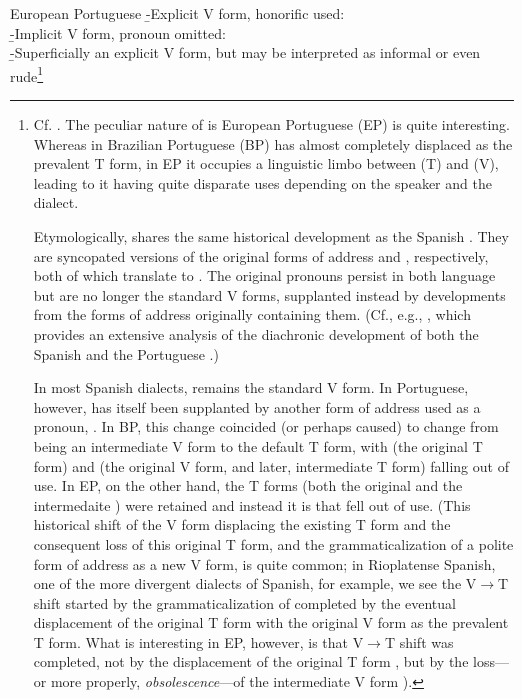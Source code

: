 \pex
	\a European Portuguese
		\beginsubsub
			\b{-}{Explicit V form, honorific used:\\
				 }
			\b{-}{Implicit V form, pronoun omitted:\\
				 }
			\b{-}{Superficially an explicit V form, but may be interpreted as informal or even rude\footnote{
				Cf. \textcite{laraport}. The peculiar nature of  is European Portuguese (EP) is quite interesting. Whereas in Brazilian Portuguese (BP)  has almost completely displaced  as the prevalent T form, in EP it occupies a linguistic limbo between  (T) and  (V), leading to it having quite disparate uses depending on the speaker and the dialect.

				Etymologically,  shares the same historical development as the Spanish . They are syncopated versions of the original forms of address  and , respectively, both of which translate to . The original pronouns  persist in both language but are no longer the standard V forms, supplanted instead by developments from the forms of address originally containing them. (Cf., e.g., \cite{hummelport}, which provides an extensive analysis of the diachronic development of both the Spanish  and the Portuguese .)
	
				In most Spanish dialects,  remains the standard V form. In Portuguese, however,  has itself been supplanted by another form of address used as a pronoun, . In BP, this change coincided (or perhaps caused)  to change from being an intermediate V form to the default T form, with  (the original T form) and  (the original V form, and later, intermediate T form) falling out of use. In EP, on the other hand, the T forms (both the original  and the intermedaite ) were retained and instead it is  that fell out of use. (This historical shift of the V form displacing the existing T form and the consequent loss of this original T form, and the grammaticalization of a polite form of address as a new V form, is quite common; in Rioplatense Spanish, one of the more divergent dialects of Spanish, for example, we see the V$\rightarrow$T shift started by the grammaticalization of  completed by the eventual displacement of the original T form  with the original V form  as the prevalent T form. What is interesting in EP, however, is that V$\rightarrow$T shift was completed, not by the displacement of the original T form , but by the loss---or more properly, \emph{obsolescence}---of the intermediate V form ).

}}
